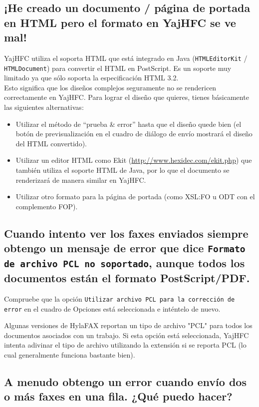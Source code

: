 \documentclass[a4paper,10pt]{scrartcl}
\begin{document}
\subsection{¡He creado un documento / página de portada en HTML pero el formato en YajHFC se ve mal!}

YajHFC utiliza el soporta HTML que está integrado en Java (\texttt{HTMLEditorKit} / \texttt{HTMLDocument}) para convertir el HTML en PostScript. Es un soporte muy limitado ya que sólo soporta la especificación HTML 3.2.\\
Esto significa que los diseños complejos seguramente no se rendericen correctamente en YajHFC.
Para lograr el diseño que quieres, tienes básicamente las siguientes alternativas:

\begin{itemize}
 \item Utilizar el método de ``prueba \& error'' hasta que el diseño quede bien (el botón de previsualización en el cuadro de diálogo de envío mostrará el diseño del HTML convertido).
 \item Utilizar un editor HTML como Ekit (\url{http://www.hexidec.com/ekit.php}) que también utiliza el soporte HTML de Java, por lo que el documento se renderizará de manera similar en YajHFC.
 \item Utilizar otro formato para la página de portada (como XSL:FO u ODT con el complemento FOP).
\end{itemize}

\subsection{Cuando intento ver los faxes enviados siempre obtengo un mensaje de error 
   que dice \texttt{Formato de archivo PCL no soportado}, aunque todos los documentos 
   están el formato PostScript/PDF.}

Compruebe que la opción \texttt{Utilizar archivo PCL para la corrección de error} en el 
cuadro de Opciones está seleccionada e inténtelo de nuevo.
 
Algunas versiones de HylaFAX reportan 
un tipo de archivo "PCL" para todos los documentos asociados con un trabajo. 
Si esta opción está seleccionada, YajHFC intenta adivinar el tipo de archivo 
utilizando la extensión si se reporta PCL (lo cual generalmente funciona bastante bien).

\subsection{A menudo obtengo un error cuando envío dos o más faxes en una fila. ¿Qué puedo hacer?}
\end{document}
